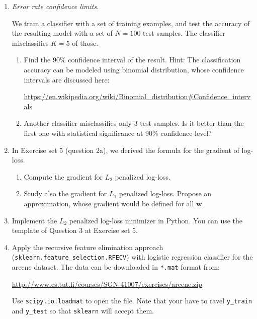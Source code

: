 \documentclass[a4paper,12pt]{scrartcl}
\newcommand{\w}{\mathbf{ w}}
\newcommand{\python}{{\fbox{\texttt{\bfseries python}}\quad}}
\newcommand{\pen}{{\fbox{\texttt{\bfseries pen\&paper}}\quad}}
\begin{document}
\begin{enumerate}

\item \pen \emph{Error rate confidence limits.}

We train a classifier with a set of training examples, and test the 
accuracy of the resulting model with a set of $N=100$ test samples.
The classifier misclassifies $K=5$ of those. 

\begin{enumerate}
	\item Find the 90\% confidence interval of the result.
Hint: The classification accuracy can be modeled using
binomial distribution, whose confidence intervals are 
discussed here:

\url{https://en.wikipedia.org/wiki/Binomial_distribution#Confidence_intervals}

\item Another classifier misclassifies only 3 test samples.
Is it better than the first one with statistical significance
at 90\% confidence level?

\end{enumerate}

\item \pen  In Exercise set 5 (question 2a), we derived the formula for the gradient of log-loss.
\begin{enumerate}
	\item Compute the gradient for $L_2$ penalized log-loss.
	\item Study also the gradient for $L_1$ penalized log-loss. Propose an approximation, whose gradient would be defined for all $\w$.
\end{enumerate}

\item \python Implement the $L_2$ penalized log-loss minimizer in Python. You can use
the template of Question 3 at Exercise set 5.

\item \python Apply the recursive feature elimination approach 
(\verb+sklearn.feature_selection.RFECV+) with logistic regression classifier 
for the arcene dataset. The data can
be downloaded in \verb+*.mat+ format from:

{\small \url{http://www.cs.tut.fi/courses/SGN-41007/exercises/arcene.zip}}

Use \verb+scipy.io.loadmat+ to open the file. Note that your have to ravel
\verb+y_train+ and \verb+y_test+ so that \texttt{sklearn} will accept them.


\end{enumerate}
\end{document}
